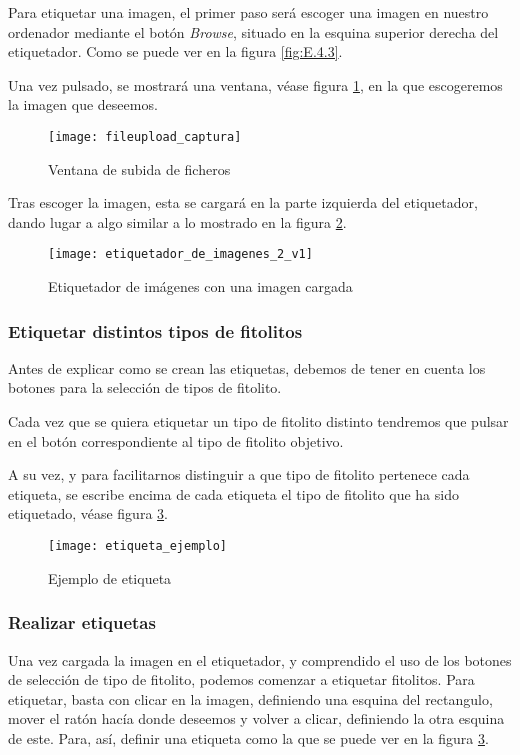 Para etiquetar una imagen, el primer paso será escoger una imagen en nuestro ordenador mediante el botón \textit{Browse}, situado en la esquina superior derecha del etiquetador. Como se puede ver en la figura \ref{fig:E.4.3}.

Una vez  pulsado, se mostrará una ventana, véase figura \ref{fig:E.4.4}, en la que escogeremos la imagen que deseemos.

\begin{figure}[h]
\centering
\texttt{[image: fileupload\_captura]}
\caption{Ventana de subida de ficheros}
\label{fig:E.4.4}
\end{figure}

Tras escoger la imagen, esta se cargará en la parte izquierda del etiquetador, dando lugar a algo similar a lo mostrado en la figura \ref{fig:E.4.5}.

\begin{figure}[h]
\centering
\texttt{[image: etiquetador\_de\_imagenes\_2\_v1]}
\caption{Etiquetador de imágenes con una imagen cargada}
\label{fig:E.4.5}
\end{figure}

\subsubsection{Etiquetar distintos tipos de fitolitos}
Antes de explicar como se crean las etiquetas, debemos de tener en cuenta los botones para la selección de tipos de fitolito.

Cada vez que se quiera etiquetar un tipo de fitolito distinto tendremos que pulsar en el botón correspondiente al tipo de fitolito objetivo.

A su vez, y para facilitarnos distinguir a que tipo de fitolito pertenece cada etiqueta, se escribe encima de cada etiqueta el tipo de fitolito que ha sido etiquetado, véase figura \ref{fig:E.4.6}.

\begin{figure}[h]
\centering
\texttt{[image: etiqueta\_ejemplo]}
\caption{Ejemplo de etiqueta}
\label{fig:E.4.6}
\end{figure}

\subsubsection{Realizar etiquetas}

Una vez cargada la imagen en el etiquetador, y comprendido el uso de los botones de selección de tipo de fitolito, podemos comenzar a  etiquetar fitolitos. Para etiquetar, basta con clicar en la imagen, definiendo una esquina del rectangulo, mover el ratón hacía donde deseemos y volver a clicar, definiendo la otra esquina de este. Para, así, definir una etiqueta como la que se puede ver en la figura \ref{fig:E.4.6}.

